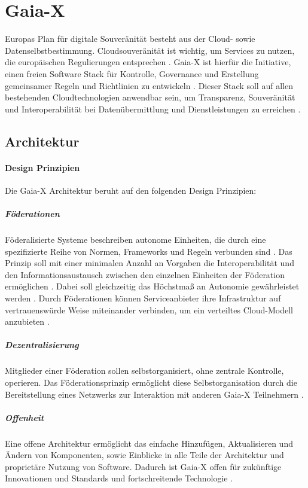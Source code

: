 \section{Gaia-X}
\label{sec:grundlagen:gaia-x}
Europas Plan für digitale Souveränität besteht aus der Cloud- sowie Datenselbstbestimmung.
Cloudsouveränität ist wichtig, um Services zu nutzen, die europäischen Regulierungen entsprechen \cite{Braud2021}.
Gaia-X ist hierfür die Initiative, einen freien Software Stack für Kontrolle, Governance und Erstellung gemeinsamer
Regeln und Richtlinien zu entwickeln \cite{Bonfiglio2021}. 
Dieser Stack soll auf allen bestehenden Cloudtechnologien anwendbar sein, um Transparenz, Souveränität und 
Interoperabilität bei Datenübermittlung und Dienstleistungen zu erreichen \cite{Bonfiglio2021}.

\subsection{Architektur}
\label{subsec:gaia-x:architektur}
\paragraph{Design Prinzipien}
Die Gaia-X Architektur beruht auf den folgenden Design Prinzipien:

\subparagraph{Föderationen}
Föderalisierte Systeme beschreiben autonome Einheiten, die durch eine spezifizierte Reihe von Normen,
Frameworks und Regeln verbunden sind \cite{GaiaXArchitecture2021}.
Das Prinzip soll mit einer minimalen Anzahl an Vorgaben die Interoperabilität und den Informationsaustausch
zwischen den einzelnen Einheiten der Föderation ermöglichen \cite{GaiaXArchitecture2021}. 
Dabei soll gleichzeitig das Höchstmaß an Autonomie gewährleistet werden \cite{GaiaXArchitecture2021}.
Durch Föderationen können Serviceanbieter ihre Infrastruktur auf vertrauenswürde Weise miteinander verbinden,
um ein verteiltes Cloud-Modell anzubieten \cite{Bonfiglio2021}.

\subparagraph{Dezentralisierung}
Mitglieder einer Föderation sollen selbstorganisiert, ohne zentrale Kontrolle, operieren.
Das Föderationsprinzip ermöglicht diese Selbstorganisation durch die Bereitstellung eines Netzwerks
zur Interaktion mit anderen Gaia-X Teilnehmern \cite{GaiaXArchitecture2021}.

\subparagraph{Offenheit}
Eine offene Architektur ermöglicht das einfache Hinzufügen, Aktualisieren und Ändern von Komponenten, sowie
Einblicke in alle Teile der Architektur und proprietäre Nutzung von Software.
Dadurch ist Gaia-X offen für zukünftige Innovationen und Standards und fortschreitende Technologie \cite{GaiaXArchitecture2021}.


